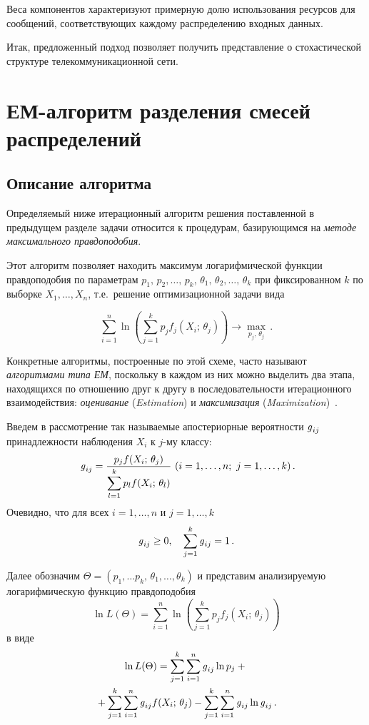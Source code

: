 \begin{multicols}{2}
Веса компонентов характеризуют примерную долю использования
ресурсов для сообщений, соответствующих каждому распределению входных
данных.

Итак, предложенный подход позволяет получить представление о
стохастической структуре телекоммуникационной сети.

\section{ЕМ-алгоритм разделения смесей распределений}

\subsection{Описание алгоритма} %

Определяемый ниже итерационный алгоритм решения поставленной в
предыдущем разделе задачи относится к процедурам, базирующимся на
\textit{методе максимального правдоподобия}.

Этот алгоритм позволяет находить максимум логарифмической функции
правдоподобия по параметрам $p_1,\,p_2,\ldots ,\,p_k$, $\theta_1 ,\,\theta_2,\ldots ,\,
\theta_k$ при фиксированном $k$ по выборке $X_1, \ldots , X_n$, т.е.\ решение
оптимизационной задачи вида

\begin{equation} \sum\limits_{i=1}^n \ln \left ( \sum\limits_{j=1}^k p_j f_j
(X_i;\,\theta_j )\right ) \rightarrow \underset{p_j,\,\theta_j}{\max}\,.
\end{equation}

Конкретные алгоритмы, построенные по этой схеме, часто называют
\textit{алгоритмами типа ЕМ}, поскольку в каждом из них можно выделить два
этапа, находящихся по отношению друг к другу в последовательности
итерационного взаимодействия: \textit{оценивание} (\textit{Estimation}) и
\textit{максимизация} (\textit{Maximization})~\cite{4bat}.

Введем в рассмотрение так называемые апостериорные вероятности
$\mbox{\textit{g}}_{ij}$ принадлежности наблюдения $X_i$ к $j$-му классу:
\begin{equation} %
\g_{ij} = \fr{p_j f(X_i;\,\theta_j )}{\sum\limits_{l=1}^k p_l f(X_i;\,\theta_l 
)} \ (i=1,\ldots , n;\ j=1,\ldots ,k)\,.\!\!\end{equation} 
Очевидно, что для 
всех $i=1,\ldots ,n$ и $j=1,\ldots ,k$
$$
\mbox{\textit{g}}_{ij} \geq 0,\quad \sum_{j=1}^k \mbox{\textit{g}}_{ij} =1\,.
$$


Далее обозначим $\Theta = (p_1,\ldots p_k,\,\theta_1,\ldots ,\theta_k )$ и
представим анализируемую логарифмическую функцию правдоподобия
$$
\ln L(\Theta ) = \sum\limits_{i=1}^n \ln \left (\sum\limits_{j=1}^k p_j f_j
(X_i;\,\theta_j )\right )
$$
в виде
\begin{multline}
\ln L (\Theta ) = \sum\limits_{j=1}^k\sum\limits_{i=1}^n \mbox{\textit{g}}_{ij} \ln p_j+{}\\
{}+\sum\limits_{j=1}^k\sum\limits_{i=1}^n \mbox{\textit{g}}_{ij} f(X_i;\,\theta_j)-
\sum\limits_{j=1}^k\sum\limits_{i=1}^n \mbox{\textit{g}}_{ij} \ln \mbox{\textit{g}}_{ij}\,.
\end{multline}


\end{multicols}
